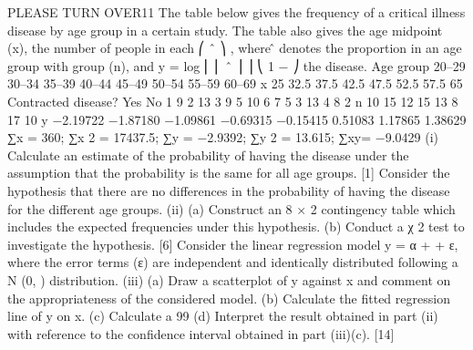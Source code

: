 \documentclass[a4paper,12pt]{article}
\begin{document}
\begin{enumerate}

PLEASE TURN OVER11
The table below gives the frequency of a critical illness disease by age group in a
certain study. The table also gives the age midpoint (x), the number of people in each
⎛ \theta ˆ ⎞
, where \thetâ denotes the proportion in an age group with
group (n), and y = log ⎜ ⎜
ˆ ⎟ ⎟
⎝ 1 − \theta ⎠
the disease.
Age group
20–29
30–34
35–39
40–44
45–49
50–54
55–59
60–69
x
25
32.5
37.5
42.5
47.5
52.5
57.5
65
Contracted
disease?
Yes No
1
9
2
13
3
9
5
10
6
7
5
3
13
4
8
2
n
10
15
12
15
13
8
17
10
y
−2.19722
−1.87180
−1.09861
−0.69315
−0.15415
0.51083
1.17865
1.38629
∑x = 360; ∑x 2 = 17437.5; ∑y = −2.9392; ∑y 2 = 13.615; ∑xy= −9.0429
(i)
Calculate an estimate of the probability of having the disease under the assumption that the probability is the same for all age groups.
[1]
Consider the hypothesis that there are no differences in the probability of having the
disease for the different age groups.
(ii)
(a) Construct an 8 × 2 contingency table which includes the expected
frequencies under this hypothesis.
(b) Conduct a χ 2 test to investigate the hypothesis.
[6]
Consider the linear regression model y = α + \betax + ε, where the error terms (ε) are
independent and identically distributed following a N (0,  ) distribution.
(iii)
(a) Draw a scatterplot of y against x and comment on the appropriateness
of the considered model.
(b) Calculate the fitted regression line of y on x.
(c) Calculate a 99%
(d) Interpret the result obtained in part (ii) with reference to the confidence
interval obtained in part (iii)(c).
[14]


\end{enumerate}
\end{document}
